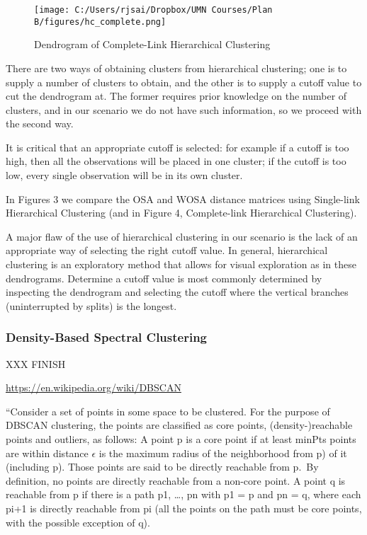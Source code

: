 \documentclass[]{article}
\begin{document}
\begin{figure}
\centering
\texttt{[image: C:/Users/rjsai/Dropbox/UMN Courses/Plan B/figures/hc\_complete.png]}
\caption{Dendrogram of Complete-Link Hierarchical Clustering}
\end{figure}

There are two ways of obtaining clusters from hierarchical clustering;
one is to supply a number of clusters to obtain, and the other is to
supply a cutoff value to cut the dendrogram at. The former requires
prior knowledge on the number of clusters, and in our scenario we do not
have such information, so we proceed with the second way.

It is critical that an appropriate cutoff is selected: for example if a
cutoff is too high, then all the observations will be placed in one
cluster; if the cutoff is too low, every single observation will be in
its own cluster.

In Figures 3 we compare the OSA and WOSA distance matrices using
Single-link Hierarchical Clustering (and in Figure 4, Complete-link
Hierarchical Clustering).

A major flaw of the use of hierarchical clustering in our scenario is
the lack of an appropriate way of selecting the right cutoff value. In
general, hierarchical clustering is an exploratory method that allows
for visual exploration as in these dendrograms. Determine a cutoff value
is most commonly determined by inspecting the dendrogram and selecting
the cutoff where the vertical branches (uninterrupted by splits) is the
longest.

\subsubsection{Density-Based Spectral
Clustering}\label{density-based-spectral-clustering}

XXX FINISH

\url{https://en.wikipedia.org/wiki/DBSCAN}

``Consider a set of points in some space to be clustered. For the
purpose of DBSCAN clustering, the points are classified as core points,
(density-)reachable points and outliers, as follows: A point p is a core
point if at least minPts points are within distance \(\epsilon\) is the
maximum radius of the neighborhood from p) of it (including p). Those
points are said to be directly reachable from p.~By definition, no
points are directly reachable from a non-core point. A point q is
reachable from p if there is a path p1, \ldots{}, pn with p1 = p and pn
= q, where each pi+1 is directly reachable from pi (all the points on
the path must be core points, with the possible exception of q).
\end{document}
